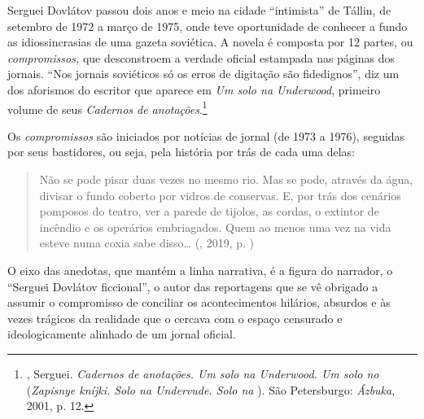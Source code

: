 \begin{center}
{}
\end{center}

Serguei Dovlátov passou dois anos e meio na cidade ``intimista'' de
Tállin, de setembro de 1972 a março de 1975, onde teve oportunidade de
conhecer a fundo as idiossincrasias de uma gazeta soviética. A novela é
composta por 12 partes, ou \emph{compromissos,} que desconstroem a
verdade oficial estampada nas páginas dos jornais. ``Nos jornais
soviéticos só os erros de digitação são fidedignos'', diz um dos
aforismos do escritor que aparece em \emph{Um solo na Underwood},
primeiro volume de seus \emph{Cadernos de anotações}.\footnote{,
  Serguei. \emph{Cadernos de anotações. Um solo na Underwood. Um solo no
  } (\emph{Zapisnye kníjki. Solo na Undervude. Solo na }). São
  Petersburgo: \emph{Ázbuka}, 2001, p. 12.}

Os \emph{compromissos} são iniciados por notícias de jornal (de 1973 a 1976),
seguidas por seus bastidores, ou seja, pela história por trás de cada
uma delas:

\begin{quotation}
Não se pode pisar duas vezes no mesmo rio. Mas se pode, através da água,
divisar o fundo coberto por vidros de conservas. E, por trás dos
cenários pomposos do teatro, ver a parede de tijolos, as cordas, o
extintor de incêndio e os operários embriagados. Quem ao menos uma vez
na vida esteve numa coxia sabe disso\ldots{} 
{}(, 2019, p. \pageref{ref0})
\end{quotation}

O eixo das anedotas, que mantém a linha narrativa, é a figura do
narrador, o ``Serguei Dovlátov ficcional'', o autor das reportagens
que se vê obrigado a assumir o compromisso de conciliar os
acontecimentos hilários, absurdos e às vezes trágicos da realidade que o
cercava com o espaço censurado e ideologicamente alinhado de um jornal
oficial.

